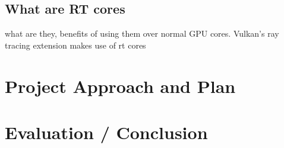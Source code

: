 \documentclass[conference]{IEEEtran}
\begin{document}
\subsection{What are RT cores} \label{title}
what are they, benefits of using them over normal GPU cores. Vulkan's ray tracing extension makes use of rt cores
\section{Project Approach and Plan} \label{project-approach}
\section{Evaluation / Conclusion}


\printbibliography[heading=bibintoc,title={References}]
\end{document}
